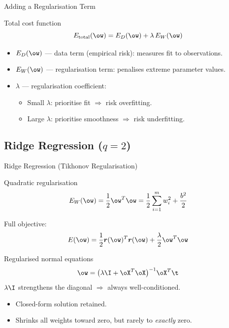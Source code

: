 \begin{frame}{Adding a Regularisation Term}
  \begin{block}{Total cost function}
    \[
      E_{\mathrm{total}}(\ow) = E_D(\ow) + \lambda\,E_W(\ow)
    \]
  \end{block}
  \begin{itemize}
    \item $E_D(\ow)$ — \alert{data term} (empirical risk): measures fit to observations.
    \item $E_W(\ow)$ — \alert{regularisation term}: penalises extreme parameter values.
    \item $\lambda$ — \alert{regularisation coefficient}:
      \begin{itemize}
        \item Small $\lambda$: prioritise fit $\Rightarrow$ risk overfitting.
        \item Large $\lambda$: prioritise smoothness $\Rightarrow$ risk underfitting.
      \end{itemize}
  \end{itemize}
\end{frame}

\subsection{Ridge Regression ($q=2$)}

\begin{frame}{Ridge Regression (Tikhonov Regularisation)}
  \begin{block}{Quadratic regularisation}
    \[
      E_W(\ow) = \frac{1}{2}\ow^T\ow = \frac{1}{2}\sum_{i=1}^m w_i^2 + \frac{b^2}{2}
    \]
  \end{block}
  Full objective:
  \[
    E(\ow) = \frac{1}{2}\boldsymbol{r}(\ow)^T\boldsymbol{r}(\ow) + \frac{\lambda}{2}\ow^T\ow
  \]
  \begin{alertblock}{Regularised normal equations}
    \[
      \ow = \bigl(\lambda\I + \oX^T\oX\bigr)^{-1}\oX^T\t
    \]
    $\lambda\I$ strengthens the diagonal $\Rightarrow$ always well-conditioned.
  \end{alertblock}
  \begin{itemize}
    \item Closed-form solution retained.
    \item Shrinks all weights toward zero, but rarely to \emph{exactly} zero.
  \end{itemize}
\end{frame}

